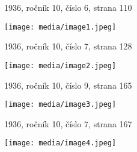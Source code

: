 1936, ročník 10, číslo 6, strana 110

\texttt{[image: media/image1.jpeg]}

1936, ročník 10, číslo 7, strana 128

\texttt{[image: media/image2.jpeg]}

1936, ročník 10, číslo 9, strana 165

\texttt{[image: media/image3.jpeg]}

1936, ročník 10, číslo 7, strana 167

\texttt{[image: media/image4.jpeg]}
